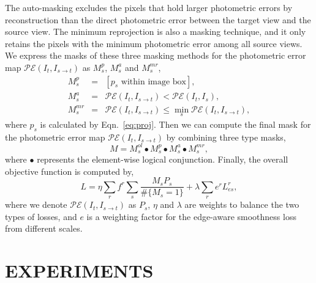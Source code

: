\documentclass[letterpaper, 10 pt, conference]{ieeeconf}
\begin{document}
The auto-masking excludes the pixels that hold larger photometric errors by reconstruction than the direct photometric error between the target view and the source view. The minimum reprojection is also a masking technique, and it only retains the pixels with the minimum photometric error among all source views. We express the masks of these three masking methods for the photometric error map $\mathcal{PE}(I_t, I_{s \to t})$ as $M_s^{p}$, $M_s^{a}$ and $M_s^{mr}$, 
\begin{eqnarray}
M_s^{p} &=& [p_s  \text{ within image box}], \label{eq:Mp} \\
M_s^{a} &=& \mathcal{PE}(I_t, I_{s \to t}) < \mathcal{PE}(I_t, I_s), \label{eq:Ma} \\
M_s^{mr} &=& \mathcal{PE}(I_t, I_{s \to t}) \leq  \min_s{\mathcal{PE}(I_t, I_{s \to t})}, \label{eq:Mmr}
\end{eqnarray}
where $p_s$ is calculated by Eqn.~\ref{eq:proj}. 
Then we can compute the final mask for the photometric error map $\mathcal{PE}(I_t, I_{s \to t})$ by combining three type masks, 
\begin{equation}
M =  M_s^{ol} \bullet M_s^{p} \bullet M_s^{a} \bullet M_s^{mr} ,
\label{eq:Mask}
\end{equation} 
where $\bullet$ represents the element-wise logical conjunction. 
Finally, the overall objective function is computed by,
\begin{equation}
L = \eta \sum_{r} f^r \sum_{s} \frac{M_sP_s}{\#\{M_s=1\}} +\lambda\sum_{r} e^rL_{es}^r, 
\label{eq:loss}
\end{equation} 
where we denote $\mathcal{PE}(I_t, I_{s \to t})$ as $P_s$, $\eta$ and $\lambda$ are weights to balance the two types of losses, and $e$ is a weighting factor for the edge-aware smoothness loss from different scales. 

\section{EXPERIMENTS}
\end{document}
